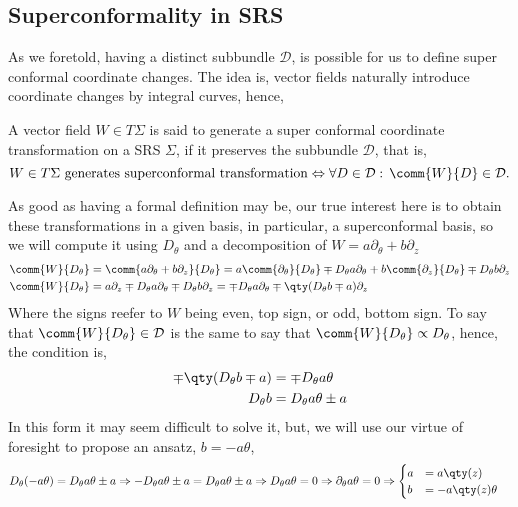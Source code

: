 \subsection{Superconformality in SRS}

As we foretold, having a distinct subbundle $\mathcal D$, is possible for us to define super conformal 
coordinate changes. The idea is, vector fields naturally introduce coordinate changes by integral curves, 
hence,
\begin{definition}
    A vector field $W\in T\Sigma$ is said to generate a super conformal coordinate transformation on a 
    SRS $\Sigma$, if it preserves the subbundle $\mathcal D$, that is, 
    $$W\in T\Sigma \textnormal{ generates superconformal transformation}\Leftrightarrow\forall D\in\mathcal D:\, \comm{W}{D}\in\mathcal D.$$
\end{definition}
As good as having a formal definition may be, our true interest here is to obtain these transformations in a given basis, 
in particular, a superconformal basis, so we will compute it using $D_\theta$ and a decomposition of $W=a\partial_\theta+b\partial_z$
\begin{align*}
    \comm{W}{D_\theta}&=\comm{a\partial_\theta+b\partial_z}{D_\theta}=a\comm{\partial_\theta}{D_\theta}\mp D_\theta a\partial_\theta+b\comm{\partial_z}{D_\theta}\mp D_\theta b\partial_z\\
    \comm{W}{D_\theta}&=a\partial_z\mp D_\theta a\partial_\theta\mp D_\theta b\partial_z=\mp D_\theta a\partial_\theta\mp \qty(D_\theta b\mp a)\partial_z
\end{align*}
Where the signs reefer to $W$ being even, top sign, or odd, bottom sign. To say that $\comm{W}{D_\theta}\in\mathcal D$ is the same 
to say that $\comm{W}{D_\theta}\propto D_\theta$, hence, the condition is,
\begin{align*}
    \mp \qty(D_\theta b\mp a)&=\mp D_\theta a\theta\\
    D_\theta b&= D_\theta a\theta\pm a
\end{align*}
In this form it may seem difficult to solve it, but, we will use our virtue of foresight to propose an ansatz, $b=-a\theta$,
\begin{align*}
    D_\theta (-a\theta)&= D_\theta a\theta\pm a\Rightarrow -D_\theta a\theta\pm a= D_\theta a\theta\pm a\Rightarrow D_\theta a\theta=0\Rightarrow \partial_\theta a\theta=0\Rightarrow \begin{cases}a&=a\qty(z)\\b&=-a\qty(z)\theta\end{cases}
\end{align*}
